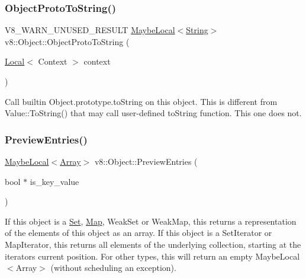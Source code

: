 \subsubsection{\texorpdfstring{Object\+Proto\+To\+String()}{ObjectProtoToString()}}
{\footnotesize\ttfamily V8\+\_\+\+W\+A\+R\+N\+\_\+\+U\+N\+U\+S\+E\+D\+\_\+\+R\+E\+S\+U\+LT \mbox{\hyperlink{classv8_1_1MaybeLocal}{Maybe\+Local}}$<$\mbox{\hyperlink{classv8_1_1String}{String}}$>$ v8\+::\+Object\+::\+Object\+Proto\+To\+String (\begin{DoxyParamCaption}\item[{\mbox{\hyperlink{classv8_1_1Local}{Local}}$<$ Context $>$}]{context }\end{DoxyParamCaption})}

Call builtin Object.\+prototype.\+to\+String on this object. This is different from Value\+::\+To\+String() that may call user-\/defined to\+String function. This one does not. \mbox{\label{classv8_1_1Object_a6705d705f6ddb941100a46875609c63a}} 
\subsubsection{\texorpdfstring{Preview\+Entries()}{PreviewEntries()}}
{\footnotesize\ttfamily \mbox{\hyperlink{classv8_1_1MaybeLocal}{Maybe\+Local}}$<$\mbox{\hyperlink{classv8_1_1Array}{Array}}$>$ v8\+::\+Object\+::\+Preview\+Entries (\begin{DoxyParamCaption}\item[{bool $\ast$}]{is\+\_\+key\+\_\+value }\end{DoxyParamCaption})}

If this object is a \mbox{\hyperlink{classv8_1_1Set}{Set}}, \mbox{\hyperlink{classv8_1_1Map}{Map}}, Weak\+Set or Weak\+Map, this returns a representation of the elements of this object as an array. If this object is a Set\+Iterator or Map\+Iterator, this returns all elements of the underlying collection, starting at the iterator\textquotesingle{}s current position. For other types, this will return an empty Maybe\+Local$<$\+Array$>$ (without scheduling an exception). \mbox{\label{classv8_1_1Object_a064c7ba0abe1237086af4201b505f91e}} 
